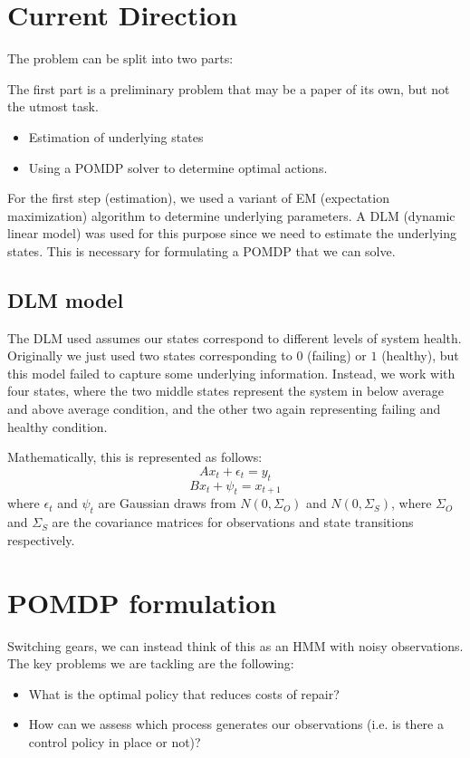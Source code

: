 \documentclass[english]{article}
\numberwithin{equation}{section}
\begin{document}
\section*{Current Direction}

The problem can be split into two parts:

The first part is a preliminary problem that may be a paper of its own, but not the utmost task.
\begin{itemize}
	\item Estimation of underlying states
	\item Using a POMDP solver to determine optimal actions.
\end{itemize}

For the first step (estimation), we used a variant of EM (expectation maximization) algorithm to determine underlying parameters. A DLM (dynamic linear model) was used for this purpose since we need to estimate the underlying states. This is necessary for formulating a POMDP that we can solve.

\subsection*{DLM model}
The DLM used assumes our states correspond to different levels of system health. Originally we just used two states corresponding to $0$ (failing) or $1$ (healthy), but this model failed to capture some underlying information. Instead, we work with four states, where the two middle states represent the system in below average and above average condition, and the other two again representing failing and healthy condition.

Mathematically, this is represented as follows:
$$Ax_t+\epsilon_t = y_t $$
$$Bx_t + \psi_t = x_{t+1} $$
where $\epsilon_t$ and $\psi_t$ are Gaussian draws from $N(0,\Sigma_O)$ and $N(0,\Sigma_S)$, where $\Sigma_O$ and $\Sigma_S$ are the covariance matrices for observations and state transitions respectively.

\section{POMDP formulation}
Switching gears, we can instead think of this as an HMM with noisy observations. The key problems we are tackling are the following:

\begin{itemize}
	\item What is the optimal policy that reduces costs of repair?
	\item How can we assess which process generates our observations (i.e. is there a control policy in place or not)?
\end{itemize}
\end{document}
